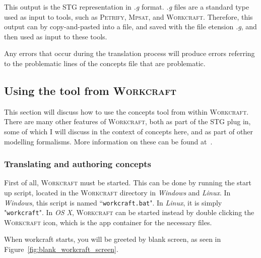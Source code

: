 \documentclass[british,conference,compsoc]{IEEEtran}
\newcommand{\noun}[1]{\textsc{#1}}
\begin{document}
This output is the STG representation in \emph{.g} format. \emph{.g} files are 
a standard type used as input to tools, such as \noun{Petrify}, \noun{Mpsat}, 
and \noun{Workcraft}. Therefore, this output can by copy-and-pasted into a file,
and saved with the file etension \emph{.g}, and then used as input to these 
tools. 

Any errors that occur during the translation process will produce errors 
referring to the problematic lines of the concepts file that are problematic. 

\subsection{Using the tool from \noun{Workcraft} \label{sec:workcraft_usage}}

This section will discuss how to use the concepts tool from within
\noun{Workcraft}. There are many other features of \noun{Workcraft}, both as 
part of the STG plug in, some of which I will discuss in the context of 
concepts here, and as part of other modelling formalisms. More information on 
these can be found at~\cite{Workcraft_website}.
 
\subsubsection{Translating and authoring concepts}

First of all, \noun{Workcraft} must be started. This can be done by running the start up script, located in the \noun{Workcraft} directory in \emph{Windows} and \emph{Linux}. In 
\emph{Windows}, this script is named ``\texttt{workcraft.bat}". In \emph{Linux}, it is simply "\texttt{workcraft}". In \emph{OS X}, \noun{Workcraft} can be started instead by double 
clicking the \noun{Workcraft} icon, which is the app container for the necessary files. 

When workcraft starts, you will be greeted by blank screen, as seen in Figure~\ref{fig:blank_workcraft_screen}.

%
%
%
\end{document}

